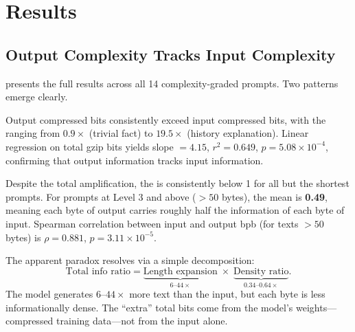 \section{Results}
\label{sec:results}

\subsection{Output Complexity Tracks Input Complexity}
\label{sec:complexity}

 presents the full results across all 14 complexity-graded prompts. Two patterns emerge clearly.

Output compressed bits consistently exceed input compressed bits, with the \infoamp ranging from $0.9\times$ (trivial fact) to $19.5\times$ (history explanation). Linear regression on total gzip bits yields slope $= 4.15$, $r^2 = 0.649$, $p = 5.08 \times 10^{-4}$, confirming that output information tracks input information.

Despite the total amplification, the \densityratio is consistently below 1 for all but the shortest prompts. For prompts at Level 3 and above ($> 50$ bytes), the mean \densityratio is {\bf 0.49}, meaning each byte of output carries roughly half the information of each byte of input. Spearman correlation between input and output bpb (for texts $> 50$ bytes) is $\rho = 0.881$, $p = 3.11 \times 10^{-5}$.

The apparent paradox resolves via a simple decomposition:
\begin{equation}
    \text{Total info ratio} = \underbrace{\text{Length expansion}}_{{6\text{--}44\times}} \;\times\; \underbrace{\text{Density ratio}}_{{0.34\text{--}0.64\times}}.
    \label{eq:decomp}
\end{equation}
The model generates $6$--$44\times$ more text than the input, but each byte is less informationally dense. The ``extra'' total bits come from the model's weights---compressed training data---not from the input alone.

